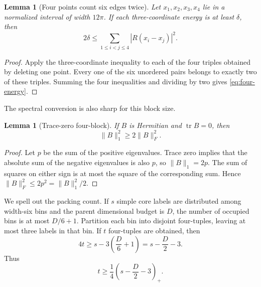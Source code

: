 \documentclass[11pt,reqno]{amsart}
\newtheorem{lemma}[theorem]{Lemma}
\theoremstyle{definition}
\theoremstyle{remark}
\newcommand{\pos}[1]{(#1)_{+}}
\DeclareMathOperator{\tr}{tr}
\begin{document}
\begin{lemma}[Four points count six edges twice]\label{lem:four-energy}
Let $x_1,x_2,x_3,x_4$ lie in a normalized interval of width $12\pi$.
If each three-coordinate energy is at least $\delta$, then
\begin{equation}\label{eq:four-energy}
 2\delta\le
 \sum_{1\le i<j\le4}|R(x_i-x_j)|^2.
\end{equation}
\end{lemma}

\begin{proof}
Apply the three-coordinate inequality to each of the four triples obtained by
deleting one point.  Every one of the six unordered pairs belongs to exactly
two of these triples.  Summing the four inequalities and dividing by two
gives \eqref{eq:four-energy}.
\end{proof}

The spectral conversion is also sharp for this block size.

\begin{lemma}[Trace-zero four-block]\label{lem:trace-zero}
If $B$ is Hermitian and $\tr B=0$, then
\begin{equation}\label{eq:trace-zero}
 \|B\|_1^2\ge2\|B\|_F^2.
\end{equation}
\end{lemma}

\begin{proof}
Let $p$ be the sum of the positive eigenvalues.  Trace zero implies that the
absolute sum of the negative eigenvalues is also $p$, so $\|B\|_1=2p$.
The sum of squares on either sign is at most the square of the corresponding
sum.  Hence $\|B\|_F^2\le2p^2=\|B\|_1^2/2$.
\end{proof}

We spell out the packing count.  If $s$ simple core labels are distributed
among width-six bins and the parent dimensional budget is $D$, the number of
occupied bins is at most $D/6+1$.  Partition each bin into disjoint
four-tuples, leaving at most three labels in that bin.  If $t$ four-tuples are
obtained, then
\[
 4t\ge s-3\left(\frac D6+1\right)
 =s-\frac D2-3.
\]
Thus
\begin{equation}\label{eq:t-count}
 t\ge\frac14\pos{s-\frac D2-3}.
\end{equation}
\end{document}
